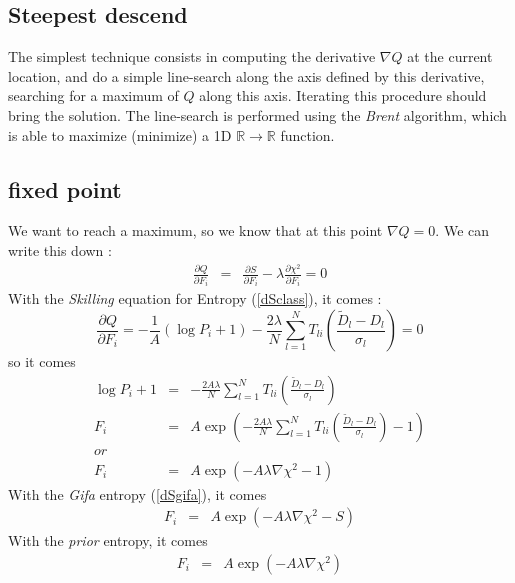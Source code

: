 \documentclass[]{article}
\newcommand{\deriv}[2]{\frac{\partial #1}{\partial #2}}
\begin{document}
\subsection{Steepest descend} %
The simplest technique consists in computing the derivative $\nabla Q$ at the current location, and do a simple line-search along the axis defined by this derivative, searching for a maximum of $Q$ along this axis. Iterating this procedure should bring the solution.
The line-search is performed using the \emph{Brent} algorithm, which is able to maximize (minimize) a 1D $\mathbb{R} \rightarrow \mathbb{R}$ function.
\subsection{fixed point} %
We want to reach a maximum, so we know that at this point $\nabla Q = 0$.
We can write this down :
\begin{eqnarray}
	\deriv{Q}{F_i} &=& \deriv{S}{F_i} - \lambda \deriv{\chi^2}{F_i} = 0
\end{eqnarray}
With the \emph{Skilling} equation for Entropy (\ref{dSclass}), it comes :
\begin{equation}
	\deriv{Q}{F_i} = - \frac{1}{A} \left ( \log{P_i} + 1 \right )
	- \frac {2 \lambda} N \sum_{l=1}^{N} T_{li} \left ( \frac {\tilde{D}_l - D_l} {\sigma_l} \right ) =0
\end{equation}
so it comes
\begin{eqnarray}
	\log{P_i} + 1 &=&  -  \frac {2 A \lambda} N  \sum_{l=1}^{N} T_{li} \left ( \frac {\tilde{D}_l - D_l}  {\sigma_l} \right ) \\
	F_i &=&  A \exp \left ( - \frac {2 A \lambda} N \sum_{l=1}^{N} T_{li} \left ( \frac {\tilde{D}_l - D_l}  {\sigma_l} \right ) - 1 \right )
	\label{fpclass} \\
	or \\
	F_i &=&  A \exp \left ( -  A \lambda \nabla \chi^2 - 1 \right )	
\end{eqnarray}
With the \emph{Gifa} entropy (\ref{dSgifa}), it comes
\begin{eqnarray}
	F_i &=&  A \exp \left ( -  A \lambda \nabla \chi^2 - S \right )	
	\label{fpgifa}
\end{eqnarray}
With the \emph{prior} entropy, it comes
\begin{eqnarray}
	F_i &=&  A \exp \left ( -  A \lambda \nabla \chi^2 \right )	
	\label{fpprior}
\end{eqnarray}
\end{document}
